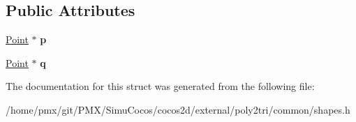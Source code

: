 \subsection*{Public Attributes}
\begin{DoxyCompactItemize}
\item 
\mbox{\label{structp2t_1_1Edge_a384f7294fd2fed7971ffcbab281a73ba}} 
\hyperlink{structp2t_1_1Point}{Point} $\ast$ {\bfseries p}
\item 
\mbox{\label{structp2t_1_1Edge_ae20ac7e995e83330fcc23b3235dcdeda}} 
\hyperlink{structp2t_1_1Point}{Point} $\ast$ {\bfseries q}
\end{DoxyCompactItemize}


The documentation for this struct was generated from the following file\+:\begin{DoxyCompactItemize}
\item 
/home/pmx/git/\+P\+M\+X/\+Simu\+Cocos/cocos2d/external/poly2tri/common/shapes.\+h\end{DoxyCompactItemize}
